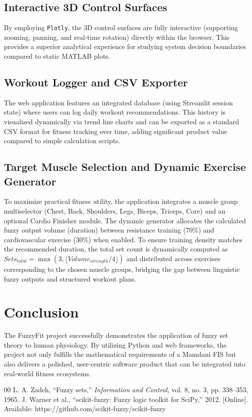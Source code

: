 \documentclass[conference]{IEEEtran}
\begin{document}
\subsection{Interactive 3D Control Surfaces}
By employing \texttt{Plotly}, the 3D control surfaces are fully interactive (supporting zooming, panning, and real-time rotation) directly within the browser. This provides a superior analytical experience for studying system decision boundaries compared to static MATLAB plots.

\subsection{Workout Logger and CSV Exporter}
The web application features an integrated database (using Streamlit session state) where users can log daily workout recommendations. This history is visualized dynamically via trend line charts and can be exported as a standard CSV format for fitness tracking over time, adding significant product value compared to simple calculation scripts.

\subsection{Target Muscle Selection and Dynamic Exercise Generator}
To maximize practical fitness utility, the application integrates a muscle group multiselector (Chest, Back, Shoulders, Legs, Biceps, Triceps, Core) and an optional Cardio Finisher module. The dynamic generator allocates the calculated fuzzy output volume (duration) between resistance training (70\%) and cardiovascular exercise (30\%) when enabled. To ensure training density matches the recommended duration, the total set count is dynamically computed as $Sets_{total} = \max(3, \lfloor Volume_{strength} / 4 \rfloor)$ and distributed across exercises corresponding to the chosen muscle groups, bridging the gap between linguistic fuzzy outputs and structured workout plans.

\section{Conclusion}
The FuzzyFit project successfully demonstrates the application of fuzzy set theory to human physiology. By utilizing Python and web frameworks, the project not only fulfills the mathematical requirements of a Mamdani FIS but also delivers a polished, user-centric software product that can be integrated into real-world fitness ecosystems.

\begin{thebibliography}{00}
 L. A. Zadeh, ``Fuzzy sets,'' \textit{Information and Control}, vol. 8, no. 3, pp. 338--353, 1965.
 J. Warner et al., ``scikit-fuzzy: Fuzzy logic toolkit for SciPy,'' 2012. [Online]. Available: https://github.com/scikit-fuzzy/scikit-fuzzy
\end{thebibliography}
\end{document}
